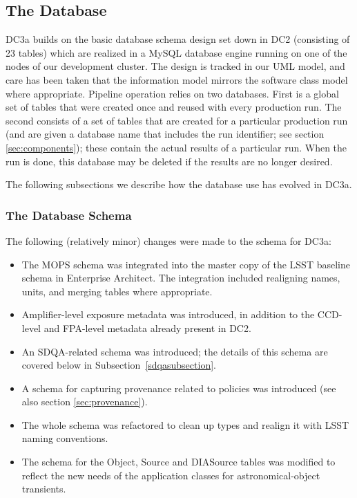 
\subsection{The Database}

DC3a builds on the basic database schema design set down in DC2
(consisting of 23 tables) which are realized in a MySQL database
engine running on one of the nodes of our development cluster.  The
design is tracked in our UML model, and care has been taken that the
information model mirrors the software class model where appropriate.
Pipeline operation relies on two databases.  First is a global set of
tables that were created once and reused with every production run.
The second consists of a set of tables that are created for a
particular production run (and are given a database name that includes
the run identifier; see section \ref{sec:components}); these contain
the actual results of a particular run.  When the run is done, this
database may be deleted if the results are no longer desired.  

The following subsections we describe how the database use has evolved
in DC3a.  

\subsubsection{The Database Schema}

The following (relatively minor) changes were made to the schema for DC3a:

\begin{itemize}

\item The MOPS schema was integrated into the master copy of the LSST
  baseline schema in Enterprise Architect.  The integration included
  realigning names, units, and merging tables where appropriate.

\item Amplifier-level exposure metadata was introduced, in addition to
  the CCD-level and FPA-level metadata already present in DC2.

\item An SDQA-related schema was introduced; the details of this
  schema are covered below in Subsection~\ref{sdqasubsection}.

\item A schema for capturing provenance related to policies was
  introduced (see also section \ref{sec:provenance}).

\item The whole schema was refactored to clean up types and realign it
  with LSST naming conventions. 

\item The schema for the Object, Source and DIASource tables was
  modified to reflect the new needs of the application classes for
  astronomical-object transients. 
\end{itemize}

